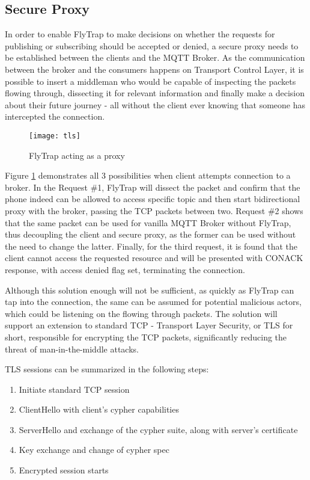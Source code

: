 \subsection{Secure Proxy}
In order to enable FlyTrap to make decisions on whether the requests for publishing or subscribing should be accepted or denied, a secure proxy needs to be established between the clients and the MQTT Broker. As the communication between the broker and the consumers happens on Transport Control Layer, it is possible to insert a middleman who would be capable of inspecting the packets flowing through, dissecting it for relevant information and finally make a decision about their future journey - all without the client ever knowing that someone has intercepted the connection. 
\begin{figure}[h]
    \centering
    \texttt{[image: tls]}
    \caption{FlyTrap acting as a proxy}
    \label{fig:tls}
\end{figure}
Figure \ref{fig:tls} demonstrates all 3 possibilities when client attempts connection to a broker. In the Request \#1, FlyTrap will dissect the packet and confirm that the phone indeed can be allowed to access specific topic and then start bidirectional proxy with the broker, passing the TCP packets between two. Request \#2 shows that the same packet can be used for vanilla MQTT Broker without FlyTrap, thus decoupling the client and secure proxy, as the former can be used without the need to change the latter. Finally, for the third request, it is found that the client cannot access the requested resource and will be presented with CONACK response, with access denied flag set, terminating the connection.

Although this solution enough will not be sufficient, as quickly as FlyTrap can tap into the connection, the same can be assumed for potential malicious actors, which could be listening on the flowing through packets. The solution will support an extension to standard TCP - Transport Layer Security, or TLS for short, responsible for encrypting the TCP packets, significantly reducing the threat of man-in-the-middle attacks.

TLS sessions can be summarized in the following steps:
\begin{enumerate}
\item Initiate standard TCP session
\item ClientHello with client's cypher capabilities 
\item ServerHello and exchange of the cypher suite, along with server's certificate
\item Key exchange and change of cypher spec
\item Encrypted session starts
\end{enumerate}

